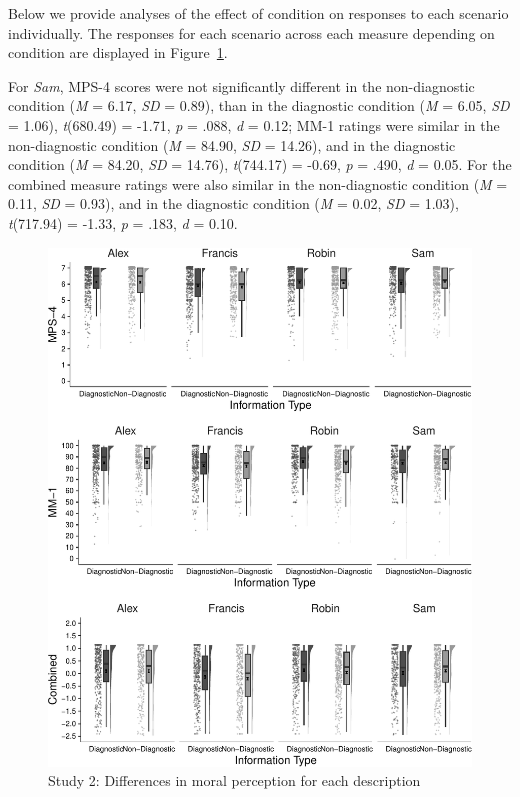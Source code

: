 \documentclass[
  man,floatsintext]{apa6}
\begin{document}
Below we provide analyses of the effect of condition on responses to each scenario individually. The responses for each scenario across each measure depending on condition are displayed in Figure~\ref{fig:S2allscenariosPlot}.

For \emph{Sam}, MPS-4 scores were not significantly different in the non-diagnostic condition (\emph{M} = 6.17, \emph{SD} = 0.89), than in the diagnostic condition (\emph{M} = 6.05, \emph{SD} = 1.06), \emph{t}(680.49) = -1.71, \emph{p} = .088, \emph{d} = 0.12; MM-1 ratings were similar in the non-diagnostic condition (\emph{M} = 84.90, \emph{SD} = 14.26), and in the diagnostic condition (\emph{M} = 84.20, \emph{SD} = 14.76), \emph{t}(744.17) = -0.69, \emph{p} = .490, \emph{d} = 0.05. For the combined measure ratings were also similar in the non-diagnostic condition (\emph{M} = 0.11, \emph{SD} = 0.93), and in the diagnostic condition (\emph{M} = 0.02, \emph{SD} = 1.03), \emph{t}(717.94) = -1.33, \emph{p} = .183, \emph{d} = 0.10.

\newpage

\begin{figure}[!h]
\includegraphics[width=\textwidth,]{Supplementary_files/figure-latex/S2allscenariosPlot-1} \caption{Study 2: Differences in moral perception for each description}\label{fig:S2allscenariosPlot}
\end{figure}
\end{document}
